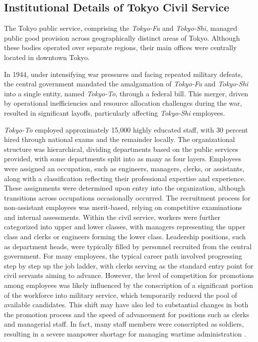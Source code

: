 \subsection{Institutional Details of Tokyo Civil Service}

The Tokyo public service, comprising the \emph{Tokyo-Fu} and \emph{Tokyo-Shi}, managed public good provision across geographically distinct areas of Tokyo. Although these bodies operated over separate regions, their main offices were centrally located in downtown Tokyo.

In 1944, under intensifying war pressures and facing repeated military defeats, the central government mandated the amalgamation of \emph{Tokyo-Fu} and \emph{Tokyo-Shi} into a single entity, named \emph{Tokyo-To}, through a federal bill. This merger, driven by operational inefficiencies and resource allocation challenges during the war, resulted in significant layoffs, particularly affecting \emph{Tokyo-Shi} employees.

\emph{Tokyo-To} employed approximately 15,000 highly educated staff, with 30 percent hired through national exams and the remainder locally. The organizational structure was hierarchical, dividing departments based on the public services provided, with some departments split into as many as four layers. Employees were assigned an occupation, such as engineers, managers, clerks, or assistants, along with a classification reflecting their professional expertise and experience. These assignments were determined upon entry into the organization, although transitions across occupations occasionally occurred. The recruitment process for non-assistant employees was merit-based, relying on competitive examinations and internal assessments. Within the civil service, workers were further categorized into upper and lower classes, with managers representing the upper class and clerks or engineers forming the lower class. Leadership positions, such as department heads, were typically filled by personnel recruited from the central government. For many employees, the typical career path involved progressing step by step up the job ladder, with clerks serving as the standard entry point for civil servants aiming to advance. However, the level of competition for promotions among employees was likely influenced by the conscription of a significant portion of the workforce into military service, which temporarily reduced the pool of available candidates. This shift may have also led to substantial changes in both the promotion process and the speed of advancement for positions such as clerks and managerial staff. In fact, many staff members were conscripted as soldiers, resulting in a severe manpower shortage for managing wartime administration \citep{CompilationofHistoricalMaterialsofTokyoII}.

